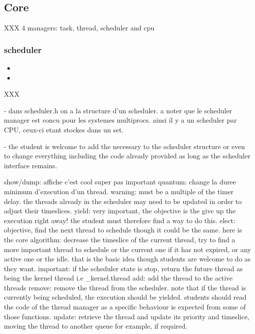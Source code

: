 \subsection{Core}

XXX 4 managers: task, thread, scheduler and cpu

\subsubsection*{scheduler}

\begin{itemize}
  \item
  \item
\end{itemize}

XXX

- dans scheduler.h on a la structure d'un scheduler. a noter que le
  scheduler manager est concu pour les systemes multiprocs. ainsi il
  y a un scheduler par CPU, ceux-ci etant stockes dans un set.

- the student is welcome to add the necessary to the scheduler structure
  or even to change everything including the code already provided as long
  as the scheduler interface remains.

  show/dump: affiche c'est cool super pas important
  quantum: change la duree minimum d'execution d'un thread. warning: must
    be a multiple of the timer delay. the threads already in the scheduler
    may need to be updated in order to adjust their timeslices.
  yield: very important, the objective is the give up the execution right
    away! the student must therefore find a way to do this.
  elect: objective, find the next thread to schedule though it could be the
    same. here is the core algorithm: decrease the timeslice of the current
    thread, try to find a more important thread to schedule or the current
    one if it has not expired, or any active one or the idle. that is the
    basic idea though students are welcome to do as they want.
    important: if the scheduler state is stop, return the future thread
    as being the kernel thread i.e \_kernel.thread
  add: add the thread to the active threads
  remove: remove the thread from the scheduler. note that if the thread
   is currently being scheduled, the execution should be yielded. students
   should read the code of the thread manager as a specific behaviour is
   expected from some of those functions.
  update: retrieve the thread and update its priority and timeslice, moving
   the thread to another queue for example, if required.

